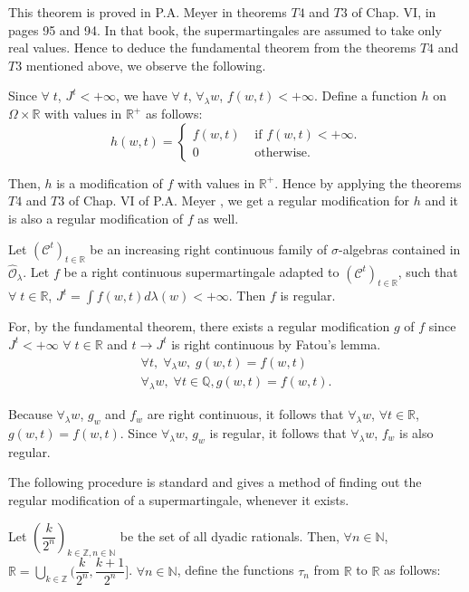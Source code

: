This theorem is proved in P.A. Meyer \cite{key1} in theorems $T4$ and
$T3$ of Chap. VI, in pages 95 and 94. In that book, the
supermartingales are assumed to take only real values. Hence to deduce
the fundamental theorem from the theorems $T4$ and $T3$ mentioned
above, we observe the following. 

Since $\forall \; t$, $J^t < + \infty$, we have $\forall \; t$,
$\forall_\lambda w$, $f(w,t) < + \infty$. Define a function $h$ on
$\Omega \times \mathbb{R}$ with values in $\mathbb{R}^+$ as follows:
$$
h(w,t) = 
\begin{cases}
f(w,t) & \text{ if } f(w,t) < + \infty.\\
0 & \text{ otherwise. }
\end{cases}
$$

Then, $h$ is a modification of $f$ with values in
$\mathbb{R}^+$. Hence by applying the theorems $T4$ and $T3$ of
Chap. VI of P.A. Meyer \cite{key1}, we get a regular modification for
$h$ and it is also a regular modification of $f$ as well. 

\begin{rem}\label{part2:chap4:rem65}
Let $(\mathscr{C}^t)_{t\in \mathbb{R}}$ be an increasing right
continuous family of $\sigma$-algebras contained in
$\hat{\mathscr{O}}_\lambda$. Let $f$ be a right continuous
supermartingale adapted to $(\mathscr{C}^t)_{t \in \mathbb{R}}$, such
that $\forall \; t \in \mathbb{R}$, $J^t = \int f(w,t) d \lambda (w) <
+ \infty$. Then $f$ is regular. 
\end{rem}

For, by the fundamental theorem, there exists a regular modification
$g$ of $f$ since $J^t < + \infty$ $\forall \; t \in \mathbb{R}$ and $t
\to J^t$ is right continuous by Fatou's lemma. 
\begin{align*}
\forall t, \; \forall_\lambda w, \; g(w,t) = f(w,t)\\
\forall_\lambda w, \; \forall t \in \mathbb{Q}, g(w,t) = f(w,t). 
\end{align*}\pageoriginale

Because $\forall_\lambda w$, $g_w$ and $f_w$ are right continuous, it
follows that $\forall_\lambda w$, $\forall t \in \mathbb{R}$, $g (w,
t) = f(w,t)$. Since $\forall_\lambda w$, $g_w$ is regular, it follows
that $\forall_\lambda w$, $f_w$ is also regular. 

The following procedure is standard and gives a method of finding out
the regular modification of a supermartingale, whenever it exists.

Let $\left( \dfrac{k}{2^n}\right)_{k \in \mathbb{Z}, n \in
  \mathbb{N}}$ be the set of all dyadic rationals. Then, $\forall n
\in \mathbb{N}$, $\mathbb{R} = \bigcup\limits_{k \in \mathbb{Z}}
(\dfrac{k}{2^n}, \dfrac{k+1}{2^n}]$. $\forall n \in \mathbb{N}$,
  define the functions $\tau_n$ from $\mathbb{R}$ to $\mathbb{R}$ as
  follows:

